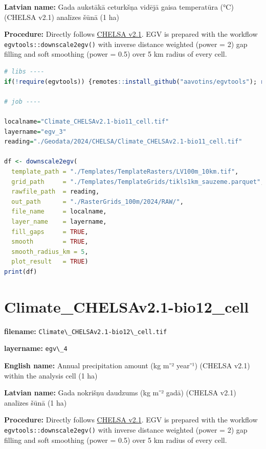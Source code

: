 \documentclass[
]{book}
\newcommand{\passthrough}[1]{#1}
\begin{document}
\textbf{Latvian name:} Gada aukstākā ceturkšņa vidējā gaisa temperatūra (°C) (CHELSA v2.1) analīzes šūnā (1 ha)

\textbf{Procedure:} Directly follows \hyperref[Ch04.11]{CHELSA v2.1}. EGV is prepared with the
workflow \passthrough{\lstinline!egvtools::downscale2egv()!} with inverse distance weighted (power = 2)
gap filling and soft smoothing (power = 0.5) over 5 km radius of every cell.

\begin{lstlisting}[language=R]
# libs ----
if(!require(egvtools)) {remotes::install_github("aavotins/egvtools"); require(egvtools)}

# job ----

localname="Climate_CHELSAv2.1-bio11_cell.tif"
layername="egv_3"
reading="./Geodata/2024/CHELSA/Climate_CHELSAv2.1-bio11_cell.tif"

df <- downscale2egv(
  template_path = "./Templates/TemplateRasters/LV100m_10km.tif",
  grid_path     = "./Templates/TemplateGrids/tikls1km_sauzeme.parquet",
  rawfile_path  = reading,
  out_path      = "./RasterGrids_100m/2024/RAW/",
  file_name     = localname,
  layer_name    = layername,
  fill_gaps     = TRUE,
  smooth        = TRUE,
  smooth_radius_km = 5,
  plot_result   = TRUE)
print(df)
\end{lstlisting}

\section{Climate\_CHELSAv2.1-bio12\_cell}\label{ch06.004}

\textbf{filename:} \passthrough{\lstinline!Climate\_CHELSAv2.1-bio12\_cell.tif!}

\textbf{layername:} \passthrough{\lstinline!egv\_4!}

\textbf{English name:} Annual precipitation amount (kg m⁻² year⁻¹) (CHELSA v2.1) within the analysis cell (1 ha)

\textbf{Latvian name:} Gada nokrišņu daudzums (kg m⁻² gadā) (CHELSA v2.1) analīzes šūnā (1 ha)

\textbf{Procedure:} Directly follows \hyperref[Ch04.11]{CHELSA v2.1}. EGV is prepared with the
workflow \passthrough{\lstinline!egvtools::downscale2egv()!} with inverse distance weighted (power = 2)
gap filling and soft smoothing (power = 0.5) over 5 km radius of every cell.
\end{document}
